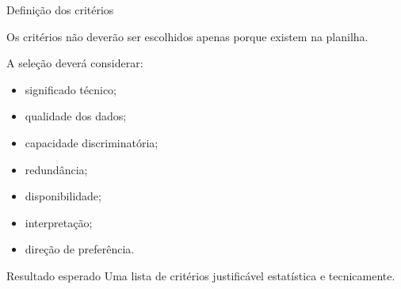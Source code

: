 \begin{frame}{Definição dos critérios}

    Os critérios não deverão ser escolhidos apenas porque existem
    na planilha.

    \vspace{0.3cm}

    A seleção deverá considerar:

    \begin{itemize}
        \item significado técnico;
        \item qualidade dos dados;
        \item capacidade discriminatória;
        \item redundância;
        \item disponibilidade;
        \item interpretação;
        \item direção de preferência.
    \end{itemize}

    \vspace{0.3cm}

    \begin{block}{Resultado esperado}
        Uma lista de critérios justificável estatística e
        tecnicamente.
    \end{block}

\end{frame}



